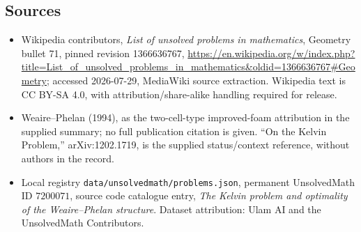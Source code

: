 \documentclass[11pt]{article}
\begin{document}
\subsection{Sources}
\begin{itemize}
\item Wikipedia contributors, \emph{List of unsolved problems in mathematics}, Geometry bullet 71, pinned revision 1366636767, \url{https://en.wikipedia.org/w/index.php?title=List_of_unsolved_problems_in_mathematics&oldid=1366636767#Geometry}; accessed 2026-07-29, MediaWiki source extraction. Wikipedia text is CC BY-SA 4.0, with attribution/share-alike handling required for release.
\item Weaire--Phelan (1994), as the two-cell-type improved-foam attribution in the supplied summary; no full publication citation is given. ``On the Kelvin Problem,'' arXiv:1202.1719, is the supplied status/context reference, without authors in the record.
\item Local registry \texttt{data/unsolvedmath/problems.json}, permanent UnsolvedMath ID $7200071$, source code catalogue entry, \emph{The Kelvin problem and optimality of the Weaire--Phelan structure}. Dataset attribution: Ulam AI and the UnsolvedMath Contributors.
\end{itemize}
\end{document}
